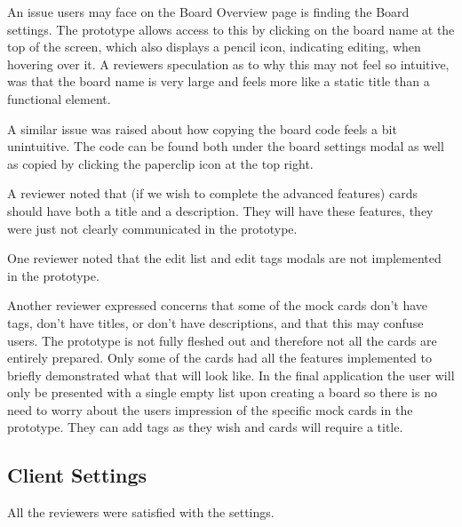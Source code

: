 An issue users may face on the Board Overview page is finding the Board settings. The prototype allows access to this by clicking on the board name at the top of the screen, which also displays a pencil icon, indicating editing, when hovering over it. A reviewers speculation as to why this may not feel so intuitive, was that the board name is very large and feels more like a static title than a functional element.

A similar issue was raised about how copying the board code feels a bit unintuitive. The code can be found both under the board settings modal as well as copied by clicking the paperclip icon at the top right.

A reviewer noted that (if we wish to complete the advanced features) cards should have both a title and a description. They will have these features, they were just not clearly communicated in the prototype.

One reviewer noted that the edit list and edit tags modals are not implemented in the prototype.

Another reviewer expressed concerns that some of the mock cards don't have tags, don't have titles, or don't have descriptions, and that this may confuse users. The prototype is not fully fleshed out and therefore not all the cards are entirely prepared. Only some of the cards had all the features implemented to briefly demonstrated what that will look like. In the final application the user will only be presented with a single empty list upon creating a board so there is no need to worry about the users impression of the specific mock cards in the prototype. They can add tags as they wish and cards will require a title.

\subsection{Client Settings}

All the reviewers were satisfied with the settings.
    

